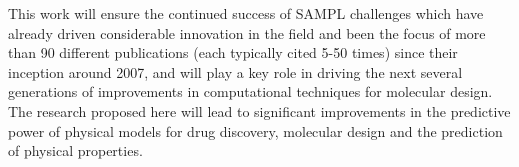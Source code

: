 \documentclass[11pt]{article}
\begin{document}
This work will ensure the continued success of SAMPL challenges which have already driven considerable innovation in the field and been the focus of more than 90 different publications (each typically cited 5-50 times) since their inception around 2007, and will play a key role in driving the next several generations of improvements in computational techniques for molecular design. 
The research proposed here will lead to significant improvements in the predictive power of physical models for drug discovery, molecular design and the prediction of physical properties.






%
%
%
%
\end{document}
